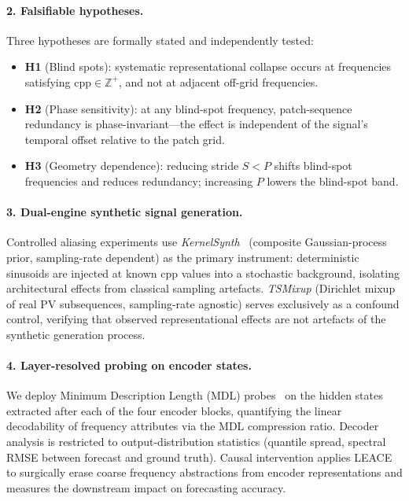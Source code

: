 \documentclass[11pt,a4paper]{article}
\begin{document}
\paragraph{2. Falsifiable hypotheses.}
Three hypotheses are formally stated and independently tested:
\begin{itemize}
    \item \textbf{H1} (Blind spots): systematic representational collapse occurs at frequencies satisfying $\mathrm{cpp}\in\mathbb{Z}^+$, and not at adjacent off-grid frequencies.
    \item \textbf{H2} (Phase sensitivity): at any blind-spot frequency, patch-sequence redundancy is phase-invariant---the effect is independent of the signal's temporal offset relative to the patch grid.
    \item \textbf{H3} (Geometry dependence): reducing stride $S < P$ shifts blind-spot frequencies and reduces redundancy; increasing $P$ lowers the blind-spot band.
\end{itemize}

\paragraph{3. Dual-engine synthetic signal generation.}
Controlled aliasing experiments use \textit{KernelSynth}~\cite{ansari2024chronos} (composite Gaussian-process prior, sampling-rate dependent) as the primary instrument: deterministic sinusoids are injected at known cpp values into a stochastic background, isolating architectural effects from classical sampling artefacts. \textit{TSMixup} (Dirichlet mixup of real PV subsequences, sampling-rate agnostic) serves exclusively as a confound control, verifying that observed representational effects are not artefacts of the synthetic generation process.

\paragraph{4. Layer-resolved probing on encoder states.}
We deploy Minimum Description Length (MDL) probes~\cite{voita2020} on the hidden states extracted after each of the four encoder blocks, quantifying the linear decodability of frequency attributes via the MDL compression ratio. Decoder analysis is restricted to output-distribution statistics (quantile spread, spectral RMSE between forecast and ground truth). Causal intervention applies LEACE~\cite{belrose2023} to surgically erase coarse frequency abstractions from encoder representations and measures the downstream impact on forecasting accuracy.
\end{document}
